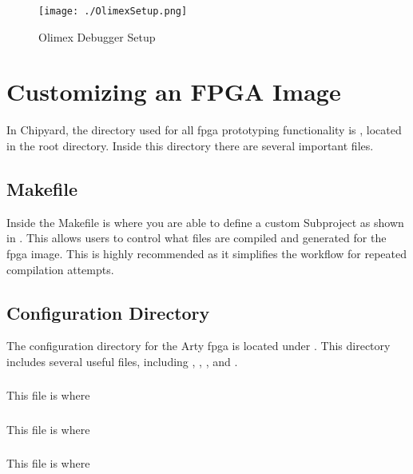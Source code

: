 \begin{figure}[h!tbp]
  \centering
  \texttt{[image: ./OlimexSetup.png]}
  \caption{Olimex Debugger Setup~\cite[p.~5]{FreedomDevGuide}}
  \label{fig:olimexsetup}
\end{figure}

\section{Customizing an FPGA Image}\label{sec:Customizing}
In Chipyard, the directory used for all \Gls{fpga} prototyping functionality is , located in the root directory.
Inside this directory there are several important files.

\subsection{Makefile}\label{sec:Customizing_FPGA-Makefile}
Inside the Makefile is where you are able to define a custom Subproject as shown in .
This allows users to control what files are compiled and generated for the \Gls{fpga} image.
This is highly recommended as it simplifies the workflow for repeated compilation attempts.

\subsection{Configuration Directory}\label{sec:Customizing_FPGA-Config_Directory}
The configuration directory for the Arty \Gls{fpga} is located under .
This directory includes several useful files, including , , , and .

\subsubsection{}\label{sec:Customizing_FPGA-Configs.scala}
This file is where

\subsubsection{}\label{sec:Customizing_FPGA-HarnessBinders.scala}
This file is where

\subsubsection{}\label{sec:Customizing_FPGA-IOBinders.scala}
This file is where

